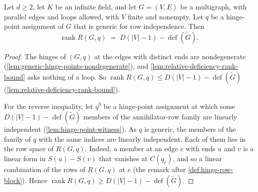 \begin{theorem}
  \label{thm:bodyhinge-generic-rank}
  \leanok
  Let $d \ge 2$, let $K$ be an infinite field, and let $G = (V, E)$ be
  a multigraph, with parallel edges and loops allowed, with $V$ finite
  and nonempty. Let $q$ be a hinge-point assignment of $G$ that is generic for row independence.
  Then
  \[
    \operatorname{rank} R(G,q)
      \;=\; D(|V|-1) - \operatorname{def}(\tilde G).
  \]
\end{theorem}
\begin{proof}
  \leanok
  The hinges of $(G, q)$ at the edges with distinct ends are
  nondegenerate (\cref{lem:generic-hinge-points-nondegenerate}), and
  \cref{lem:relative-deficiency-rank-bound} asks nothing of a loop. So
  $\operatorname{rank} R(G,q) \le D(|V|-1) - \operatorname{def}(\tilde G)$
  (\cref{lem:relative-deficiency-rank-bound}).

  For the reverse inequality, let $q^0$ be a hinge-point assignment at
  which some $D(|V|-1) - \operatorname{def}(\tilde G)$ members of the
  annihilator-row family are linearly independent
  (\cref{lem:hinge-point-witness}). As $q$ is generic, the members of
  the family of $q$ with the same indices are linearly independent.
  Each of them lies in the row space of $R(G, q)$. Indeed, a member at
  an edge $e$ with ends $u$ and $v$ is a linear form in $S(u) - S(v)$
  that vanishes at $C(q_e)$, and so a linear combination of the rows of
  $R(G, q)$ at $e$ (the remark after \cref{def:hinge-row-block}). Hence
  $\operatorname{rank} R(G,q) \ge D(|V|-1) - \operatorname{def}(\tilde G)$.
\end{proof}

